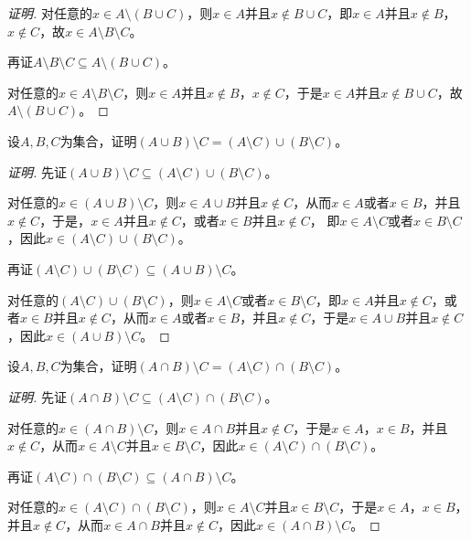 \documentclass{article}
\begin{document}
\begin{CJK}{UTF8}{gbsn}
\begin{proof}[证明]
  对任意的$x\in A\setminus (B\cup C)$，则$x\in A$并且$x\notin B\cup C$，即$x\in A$并且$x\notin B$，$x\notin C$，故$x\in A\setminus B \setminus C$。
  
  再证$A\setminus B \setminus C\subseteq A\setminus (B\cup C) $。

  对任意的$x\in A\setminus B \setminus C$，则$x\in A$并且$x\notin B$，$x\notin C$，于是$x\in A$并且$x\notin B\cup C$，故$A\setminus (B\cup C)$。

\end{proof}
\begin{Exercise}
  设$A,B,C$为集合，证明$(A\cup B)\setminus C = (A\setminus C) \cup (B\setminus C)$。
\end{Exercise}
\begin{proof}[证明]
  先证$(A\cup B)\setminus C \subseteq (A\setminus C) \cup (B\setminus C)$。

  对任意的$x\in (A\cup B)\setminus C$，则$x\in A\cup B$并且$x\notin C$，从而$x\in A$或者$x\in B$，并且$x\notin C$，于是，$x\in A$并且$x\notin C$，或者$x\in B$并且$x\notin C$，
  即$x\in A\setminus C$或者$x\in B\setminus C$，因此$x\in (A\setminus C) \cup (B\setminus C)$。

  再证$(A\setminus C) \cup (B\setminus C) \subseteq (A\cup B)\setminus C$。

  对任意的$(A\setminus C) \cup (B\setminus C)$，则$x\in A\setminus C$或者$x\in B\setminus C$，即$x\in A$并且$x\notin C$，或者$x\in B$并且$x\notin C$，从而$x\in A$或者$x\in B$，并且$x\notin C$，于是$x\in A\cup B$并且$x\notin C$，因此$x\in (A\cup B)\setminus C$。
\end{proof}
\begin{Exercise}
  设$A,B,C$为集合，证明$(A\cap B)\setminus C = (A\setminus C) \cap (B\setminus C)$。
\end{Exercise}
\begin{proof}[证明]
  先证$(A\cap B)\setminus C \subseteq (A\setminus C) \cap (B\setminus C)$。

对任意的$x\in (A\cap B)\setminus C$，则$x\in A\cap B$并且$x\notin C$，于是$x\in A$，$x\in B$，并且$x\notin C$，从而$x\in A\setminus C$并且$x\in B\setminus C$，因此$x\in (A\setminus C) \cap (B\setminus C)$。


  再证$(A\setminus C) \cap (B\setminus C) \subseteq (A\cap B)\setminus C$。

  对任意的$x\in (A\setminus C) \cap (B\setminus C)$，则$x\in A\setminus C$并且$x\in B\setminus C$，于是$x\in A$，$x\in B$，并且$x\notin C$，从而$x\in A\cap B$并且$x\notin C$，因此$x\in (A\cap B)\setminus C$。


\end{proof}
\end{CJK}
\end{document}

